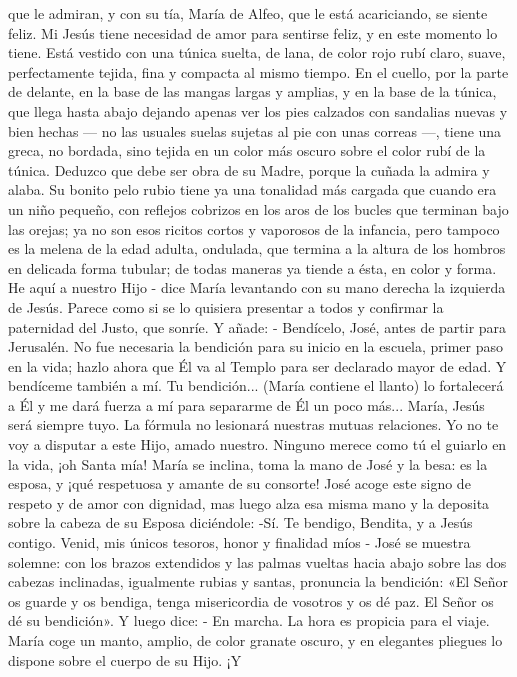 \documentclass[12pt]{book} %
\begin{document}
que le admiran, y con su tía, María de Alfeo, que le está acariciando, se siente feliz. Mi Jesús tiene necesidad de amor para sentirse feliz, y en este momento lo tiene. 
Está vestido con una túnica suelta, de lana, de color rojo rubí claro, suave, perfectamente tejida, fina y compacta al 
mismo tiempo. En el cuello, por la parte de delante, en la base de las mangas largas y amplias, y en la base de la túnica, que llega hasta abajo dejando apenas ver los pies calzados con sandalias nuevas y bien hechas — no las usuales suelas sujetas al pie con unas correas —, tiene una greca, no bordada, sino tejida en un color más oscuro sobre el color rubí de la túnica. Deduzco que debe ser obra de su Madre, porque la cuñada la admira y alaba. 
Su bonito pelo rubio tiene ya una tonalidad más cargada que cuando era un niño pequeño, con reflejos cobrizos en los 
aros de los bucles que terminan bajo las orejas; ya no son esos ricitos cortos y vaporosos de la infancia, pero tampoco es la melena de la edad adulta, ondulada, que termina a la altura de los hombros en delicada forma tubular; de todas maneras ya tiende a ésta, en color y forma. 
He aquí a nuestro Hijo - dice María levantando con su mano derecha la izquierda de Jesús. Parece como si se lo quisiera presentar a todos y confirmar la paternidad del Justo, que sonríe. Y añade: - Bendícelo, José, antes de partir para Jerusalén. No fue necesaria la bendición para su inicio en la escuela, primer paso en la vida; hazlo ahora que Él va al Templo para ser declarado mayor de edad. Y bendíceme también a mí. Tu bendición... (María contiene el llanto) lo fortalecerá a Él y me dará fuerza a mí para separarme de Él un poco más... 
María, Jesús será siempre tuyo. La fórmula no lesionará nuestras mutuas relaciones. Yo no te voy a disputar a este Hijo, amado nuestro. Ninguno merece como tú el guiarlo en la vida, ¡oh Santa mía! 
María se inclina, toma la mano de José y la besa: es la esposa, y ¡qué respetuosa y amante de su consorte! 
José acoge este signo de respeto y de amor con dignidad, mas luego alza esa misma mano y la deposita sobre la cabeza 
de su Esposa diciéndole: 
-Sí. Te bendigo, Bendita, y a Jesús contigo. Venid, mis únicos tesoros, honor y finalidad míos - José se muestra solemne: con los brazos extendidos y las palmas vueltas hacia abajo sobre las dos cabezas inclinadas, igualmente rubias y santas, pronuncia la bendición: «El Señor os guarde y os bendiga, tenga misericordia de vosotros y os dé paz. El Señor os dé su bendición». Y luego dice: - En marcha. La hora es propicia para el viaje. 
María coge un manto, amplio, de color granate oscuro, y en elegantes pliegues lo dispone sobre el cuerpo de su Hijo. ¡Y 
\end{document}
